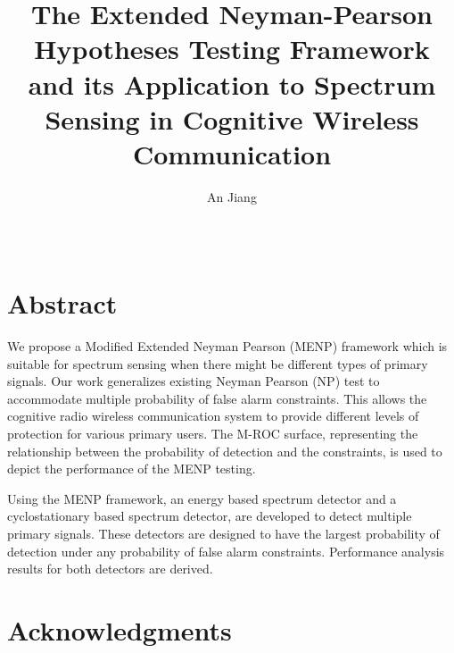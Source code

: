 \documentclass [12pt,letterpaper]{report}
\begin{document}

\title{The Extended Neyman-Pearson Hypotheses Testing Framework and its Application to Spectrum Sensing in Cognitive Wireless Communication}
\author{An Jiang}
\date{\Month\ \number\year}

\maketitle

\raggedbottom
\doublespacing
{}

\section*{\centering Abstract}
We propose a Modified Extended Neyman Pearson (MENP) framework which is suitable for spectrum sensing when there might be different types of primary signals. Our work generalizes existing Neyman Pearson (NP) test to accommodate multiple probability of false alarm constraints. This allows the cognitive radio wireless communication system to provide different levels of protection for various primary users.  
The M-ROC surface, representing the relationship between the probability of detection and the constraints, is used to depict the performance of the MENP testing.   

Using the MENP framework, an energy based spectrum detector and a cyclostationary based spectrum detector, are developed to detect multiple primary signals. These detectors are designed to have the largest probability of detection under any probability of false alarm constraints.  
Performance analysis results  for both detectors are derived.  
\newpage

\section*{\centering Acknowledgments}
\end{document}
